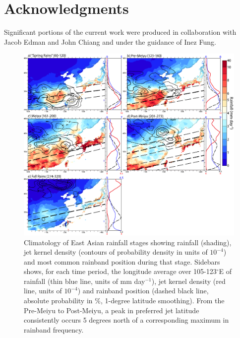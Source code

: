 	
\section{Acknowledgments}

	Significant portions of the current work were produced in collaboration with Jacob Edman and John Chiang and under the guidance of Inez Fung.


\begin{figure}
\centering
\noindent\includegraphics[width=36pc]{Figures/ch4/climo}
\caption{Climatology of East Asian rainfall stages showing rainfall (shading), jet kernel density (contours of probability density in units of $10^{-4}$) and most common rainband position during that stage. Sidebars shows, for each time period, the longitude average over 105-123$^{\circ}$E of rainfall (thin blue line, units of mm day$^{-1}$), jet kernel density (red line, units of $10^{-4}$) and rainband position (dashed black line, absolute probability in \%, 1-degree latitude smoothing). From the Pre-Meiyu to Post-Meiyu, a peak in preferred jet latitude consistently occurs 5 degrees north of a corresponding maximum in rainband frequency.}
\label{fig:climo}
\end{figure}


